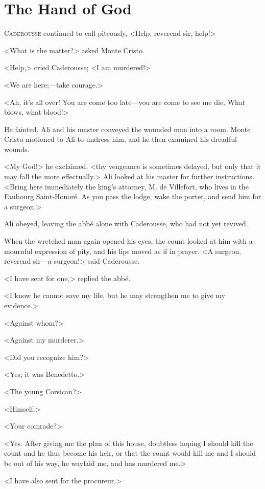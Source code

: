 \chapter{The Hand of God} 

 \lettrine{C}{aderousse} continued to call piteously, <Help, reverend sir, help!> 

\zz
 <What is the matter?> asked Monte Cristo. 

\zz
 <Help,> cried Caderousse; <I am murdered!> 

\zz
 <We are here;—take courage.> 

 <Ah, it's all over! You are come too late—you are come to see me die. What blows, what blood!> 

 He fainted. Ali and his master conveyed the wounded man into a room. Monte Cristo motioned to Ali to undress him, and he then examined his dreadful wounds. 

 <My God!> he exclaimed, <thy vengeance is sometimes delayed, but only that it may fall the more effectually.> Ali looked at his master for further instructions. <Bring here immediately the king's attorney, M. de Villefort, who lives in the Faubourg Saint-Honoré. As you pass the lodge, wake the porter, and send him for a surgeon.> 

 Ali obeyed, leaving the abbé alone with Caderousse, who had not yet revived. 

 When the wretched man again opened his eyes, the count looked at him with a mournful expression of pity, and his lips moved as if in prayer. <A surgeon, reverend sir—a surgeon!> said Caderousse. 

 <I have sent for one,> replied the abbé. 

 <I know he cannot save my life, but he may strengthen me to give my evidence.> 

 <Against whom?> 

 <Against my murderer.> 

 <Did you recognize him?> 

 <Yes; it was Benedetto.> 

 <The young Corsican?> 

 <Himself.> 

 <Your comrade?> 

 <Yes. After giving me the plan of this house, doubtless hoping I should kill the count and he thus become his heir, or that the count would kill me and I should be out of his way, he waylaid me, and has murdered me.> 

 <I have also sent for the procureur.> 

